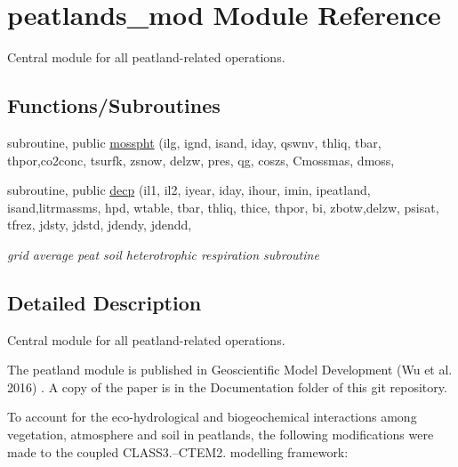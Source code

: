 \hypertarget{namespacepeatlands__mod}{}\section{peatlands\+\_\+mod Module Reference}
\label{namespacepeatlands__mod}


Central module for all peatland-\/related operations.  


\subsection*{Functions/\+Subroutines}
{\bf }\par
\begin{DoxyCompactItemize}
\item 
subroutine, public \hyperlink{group__moss__photosynthesis_ga565649752afaf2aed6806523515f0b8e}{mosspht} (ilg, ignd, isand, iday, qswnv, thliq, tbar, thpor,co2conc, tsurfk, zsnow, delzw, pres, qg, coszs, Cmossmas, dmoss,
\end{DoxyCompactItemize}

{\bf }\par
\begin{DoxyCompactItemize}
\item 
subroutine, public \hyperlink{group__peat__soil__het__resp_gaaae8be8aff383785b6668d179fe84d63}{decp} (il1, il2, iyear, iday, ihour, imin, ipeatland, isand,litrmassms, hpd, wtable, tbar, thliq, thice, thpor, bi, zbotw,delzw, psisat, tfrez, jdsty, jdstd, jdendy, jdendd,
\begin{DoxyCompactList}\small\item\em grid average peat soil heterotrophic respiration subroutine \end{DoxyCompactList}\end{DoxyCompactItemize}



\subsection{Detailed Description}
Central module for all peatland-\/related operations. 

The peatland module is published in Geoscientific Model Development (Wu et al. 2016) \cite{Wu2016-zt}. A copy of the paper is in the Documentation folder of this git repository. 

 To account for the eco-\/hydrological and biogeochemical interactions among vegetation, atmosphere and soil in peatlands, the following modifications were made to the coupled C\+L\+A\+S\+S3.--C\+T\+E\+M2. modelling framework\+:


